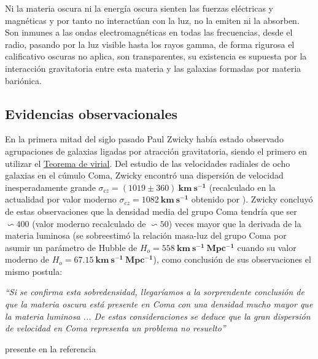 Ni la materia oscura ni la energía oscura sienten las fuerzas eléctricas y magnéticas y por tanto no interactúan con la luz, no la emiten ni la absorben. Son inmunes a las ondas electromagnéticas en todas las frecuencias, desde el radio, pasando por la luz visible hasta los rayos gamma, de forma rigurosa el calificativo oscuras no aplica, son transparentes, su existencia es supuesta por la interacción gravitatoria entre esta materia y las galaxias formadas por materia bariónica.


\subsection{Evidencias observacionales}

En la primera mitad del siglo pasado Paul Zwicky había estado observado agrupaciones de galaxias ligadas por atracción gravitatoria, siendo el primero en utilizar el \href{https://es.wikipedia.org/wiki/Teorema_del_virial}{Teorema de virial}. Del estudio de las velocidades radiales de ocho galaxias en el cúmulo Coma, Zwicky encontró una dispersión de velocidad inesperadamente grande $\sigma_{cz} = (1019 \pm 360) ~ \mathbf{km ~ s^{-1}}$ (recalculado en la actualidad por valor moderno $\sigma_{cz} = 1082 ~ \mathbf{km ~ s^{-1}}$ obtenido por \cite{colless_structure_1996}). Zwicky concluyó de estas observaciones que la densidad media del grupo Coma tendría que ser $\backsim 400$ (valor moderno recalculado de $\backsim 50$) veces mayor que la derivada de la materia luminosa (se sobreestimó la relación masa-luz del grupo Coma por asumir un parámetro de Hubble de $H_o = 558 ~ \mathbf{km ~ s^{-1} ~Mpc^{-1}}$ cuando su valor moderno de $H_o = 67.15~\mathbf{km~s^{-1} ~Mpc^{-1}}$), como conclusión de sus observaciones el mismo postula:

\begin{minipage}{0.9\linewidth}
\vspace{5pt}%
{\small }
\textit{``Si se confirma esta sobredensidad, llegaríamos a la sorprendente conclusión de que la materia oscura está presente en Coma con una densidad mucho mayor que la materia luminosa ... De estas consideraciones se deduce que la gran dispersión de velocidad en Coma representa un problema no resuelto''}
\begin{flushright}
presente en la referencia \cite{bergh_early_1999}
\end{flushright}
\vspace{5pt}%
\end{minipage}

